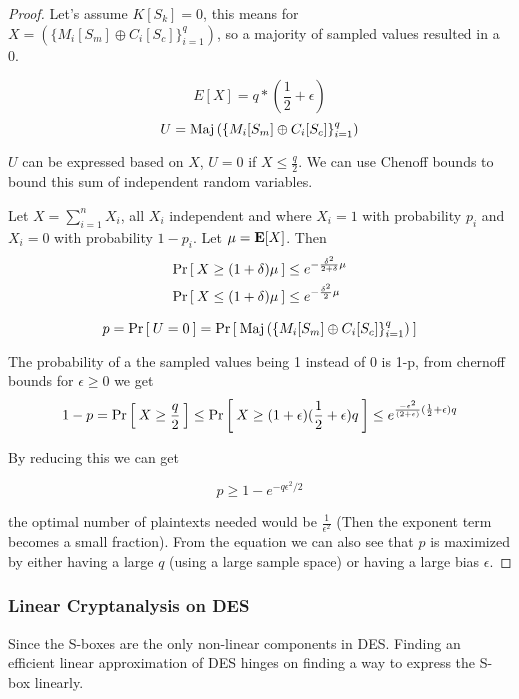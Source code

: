\begin{proof}
	Let's assume \(K[S_k] = 0\), this means for \(X = \left(\{M_i[S_m]\oplus C_i[S_c]\}_{i=1}^q\right)\), so a majority of sampled values resulted in a 0. \newline

	\[ E[X] = q*(\frac{1}{2} + \epsilon) \]
	\[ U = \textnormal{Maj}\left(\{M_i[S_m]\oplus C_i[S_c]\}_{i=1}^q\right) \]


    $U$ can be expressed based on $X$, $U = 0$ if $ X \le \frac{q}{2}$. We can use Chenoff bounds to bound this sum of independent random variables.\newline
	\begin{theorem}
	Let $X = \sum_{i=1}^n X_i$, all $X_i$ independent and where $X_i = 1$ with probability $p_i$ and $X_i = 0$
	with probability $1-p_i$. Let $\mu = {\textbf E}[X]$. Then  
	\begin{align}
  	\Pr\left[\: X \ge (1 + \delta)\mu \:\right] &\le e^{-\frac{\delta^2}{2+\delta}\mu}\\
  	\Pr\left[\: X \le (1 + \delta)\mu \:\right] &\le e^{-\frac{\delta^2}{2}\mu}
	\end{align}
	\end{theorem}

	\[ p = \Pr\left[\: U = 0 \:\right] = \Pr\left[\: \textnormal{Maj}\left(\{M_i[S_m]\oplus C_i[S_c]\}_{i=1}^q\right) \:\right] \]

	The probability of a the sampled values being 1 instead of 0 is 1-p, from chernoff bounds for \( \epsilon \geq 0 \) we get
	\[ 1 - p = \Pr\left[\: X \geq \frac{q}{2} \:\right] \leq \Pr\left[\: X \geq (1+ \epsilon)(\frac{1}{2} + \epsilon)q \:\right] \leq e^{\frac{-\epsilon^2}{(2 + \epsilon)}(\frac{1}{2} + \epsilon)q}\] 

	By reducing this we can get

	\[ p \geq 1 - e^{-q\epsilon^2/2} \]

	the optimal number of plaintexts needed would be \( \frac{1}{\epsilon^2}\) (Then the exponent term becomes a small fraction). From the equation we can also see that $p$ is maximized by either having a large $q$ (using a large sample space) or having a large bias $\epsilon$.
\end{proof}

\subsubsection*{Linear Cryptanalysis on DES} Since the S-boxes are the only non-linear components in DES. Finding an efficient linear approximation
of DES hinges on finding a way to express the S-box linearly. \newline


